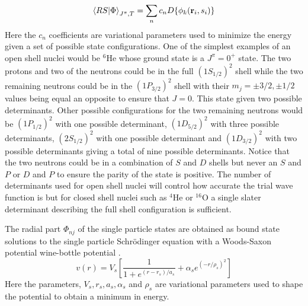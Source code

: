\begin{equation}
   \left< RS | \Phi \right>_{J^\pi,T} = \sum\limits_n c_n D\{\phi_k(\mathbf{r}_i,s_i)\}
\end{equation}
Here the $c_n$ coefficients are variational parameters used to minimize the energy given a set of possible state configurations. One of the simplest examples of an open shell nuclei would be $^6$He whose ground state is a $J^\pi = 0^+$ state. The two protons and two of the neutrons could be in the full $(1S_{1/2})^2$ shell while the two remaining neutrons could be in the $(1P_{3/2})^2$ shell with their $m_j=\pm 3/2, \pm 1/2$ values being equal an opposite to ensure that $J=0$. This state given two possible determinants. Other possible configurations for the two remaining neutrons would be $(1P_{1/2})^2$ with one possible determinant, $(1D_{5/2})^2$ with three possible determinants, $(2S_{1/2})^2$ with one possible determinant and $(1D_{3/2})^2$ with two possible determinants giving a total of nine possible determinants. Notice that the two neutrons could be in a combination of $S$ and $D$ shells but never an $S$ and $P$ or $D$ and $P$ to ensure the parity of the state is positive. The number of determinants used for open shell nuclei will control how accurate the trial wave function is but for closed shell nuclei such as $^4$He or $^{16}$O a single slater determinant describing the full shell configuration is sufficient.

The radial part $\Phi_{nj}$ of the single particle states are obtained as bound state solutions to the single particle Schr\"odinger equation with a Woods-Saxon potential wine-bottle potential .
\begin{equation}
   v(r) = V_s\left[\frac{1}{1+e^{(r-r_s)/a_s}} + \alpha_se^{(-r/\rho_s)^2}\right]
\end{equation}
Here the parameters, $V_s, r_s, a_s, \alpha_s$ and $\rho_s$ are variational parameters used to shape the potential to obtain a minimum in energy.

